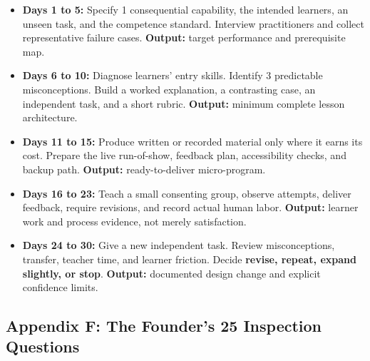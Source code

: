 \begin{itemize}[leftmargin=1.5em, itemsep=0.6em]
    \item \textbf{Days 1 to 5:} Specify 1 consequential capability, the intended learners, an unseen task, and the competence standard. Interview practitioners and collect representative failure cases. \textbf{Output:} target performance and prerequisite map.
    \item \textbf{Days 6 to 10:} Diagnose learners' entry skills. Identify 3 predictable misconceptions. Build a worked explanation, a contrasting case, an independent task, and a short rubric. \textbf{Output:} minimum complete lesson architecture.
    \item \textbf{Days 11 to 15:} Produce written or recorded material only where it earns its cost. Prepare the live run-of-show, feedback plan, accessibility checks, and backup path. \textbf{Output:} ready-to-deliver micro-program.
    \item \textbf{Days 16 to 23:} Teach a small consenting group, observe attempts, deliver feedback, require revisions, and record actual human labor. \textbf{Output:} learner work and process evidence, not merely satisfaction.
    \item \textbf{Days 24 to 30:} Give a new independent task. Review misconceptions, transfer, teacher time, and learner friction. Decide \textbf{revise, repeat, expand slightly, or stop}. \textbf{Output:} documented design change and explicit confidence limits.
\end{itemize}

\subsection*{Appendix F: The Founder's 25 Inspection Questions}

